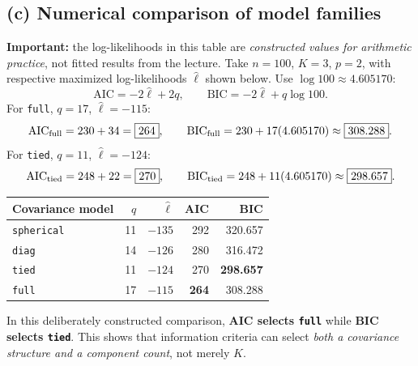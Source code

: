 \subsection*{(c) Numerical comparison of model families}
\textbf{Important:} the log-likelihoods in this table are \emph{constructed values for arithmetic practice}, not fitted results from the lecture. Take $n=100$, $K=3$, $p=2$, with respective maximized log-likelihoods $\hat\ell$ shown below. Use $\log 100\approx4.605170$:
\[
\mathrm{AIC}=-2\hat\ell+2q,\qquad
\mathrm{BIC}=-2\hat\ell+q\log100.
\]
For \texttt{full}, $q=17$, $\hat\ell=-115$:
\[
\mathrm{AIC}_{\rm full}=230+34=\boxed{264},\qquad
\mathrm{BIC}_{\rm full}=230+17(4.605170)\approx\boxed{308.288}.
\]
For \texttt{tied}, $q=11$, $\hat\ell=-124$:
\[
\mathrm{AIC}_{\rm tied}=248+22=\boxed{270},\qquad
\mathrm{BIC}_{\rm tied}=248+11(4.605170)\approx\boxed{298.657}.
\]
\begin{center}\small
\begin{tabular}{@{}lrrrr@{}}\toprule
Covariance model & $q$ & $\hat\ell$ & AIC & BIC\\\midrule
\texttt{spherical} & 11 & $-135$ & 292 & 320.657\\
\texttt{diag} & 14 & $-126$ & 280 & 316.472\\
\texttt{tied} & 11 & $-124$ & 270 & \textbf{298.657}\\
\texttt{full} & 17 & $-115$ & \textbf{264} & 308.288\\\bottomrule
\end{tabular}
\end{center}
\begin{answer}
In this deliberately constructed comparison, \textbf{AIC selects \texttt{full}} while \textbf{BIC selects \texttt{tied}}. This shows that information criteria can select \emph{both a covariance structure and a component count}, not merely $K$.
\end{answer}

